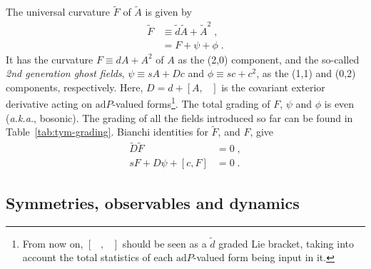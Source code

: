 \documentclass[../main/tex]{subfiles}
\begin{document}
The universal curvature $ \tilde{F} $ of $\tilde{A}$ is given by
\begin{subequations}\label{eq:universal-curvature}
  \begin{align}
    \tilde{F} & \equiv \tilde{d}\tilde{A}+\tilde{A}^2\;, \\
              & = F+\psi+\phi \;.
  \end{align}
\end{subequations}
It has the curvature $F\equiv dA+A^2$ of $A$ as the (2,0) component, and the so-called \emph{2nd generation ghost fields}, $\psi \equiv sA + Dc$ and $\phi \equiv sc + c^2$, as the (1,1) and (0,2) components, respectively. Here, $D=d+ \left[ A, \phantom{A} \right]$ is the covariant exterior derivative acting on $\mathrm{ad}P$-valued forms\footnote{From now on, $\left[ \phantom{ A }, \phantom{ A } \right]$ should be seen as a $\tilde{d}$ graded Lie bracket, taking into account the total statistics of each $\mathrm{ad}P$-valued form being input in it.}. The total grading of $F$, $\psi$ and $\phi$ is even (\textit{a.k.a.}, bosonic). The grading of all the fields introduced so far can be found in Table~\ref{tab:tym-grading}. Bianchi identities for $\tilde{F}$, and $F$, give
\begin{subequations}\label{eq:universal-bianchi-identity}
  \begin{align}
    \tilde{D}\tilde{F}          & =0 \;,  \\
    sF+D\psi+\left[ c,F \right] & = 0 \;.
  \end{align}
\end{subequations}

\subsection{Symmetries, observables and dynamics}\label{ssec:sym-and-obs;sec:tym}
\end{document}
